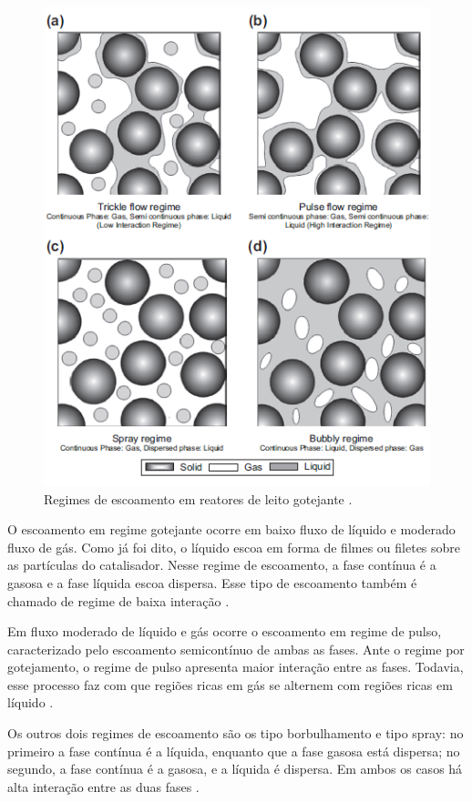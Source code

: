 \begin{enumerate}
 \begin{figure}[htb]
 \centering \includegraphics[scale=0.75]{images/Chap2/regimeescoamento.png}
 \caption{Regimes de escoamento em reatores de leito gotejante \cite{Gunjal2005}.}
 \label{fig:regimeescoamento}
 \end{figure}

O escoamento em regime gotejante ocorre em baixo fluxo de líquido e moderado
fluxo de gás. Como já foi dito, o líquido escoa em forma de filmes ou filetes
sobre as partículas do catalisador. Nesse regime de escoamento, a fase contínua
é a gasosa e a fase líquida escoa dispersa. Esse tipo de escoamento também é
chamado de regime de baixa interação \cite{Saroha1996}.

Em fluxo moderado de líquido e gás ocorre o escoamento em regime de pulso,
caracterizado pelo escoamento semicontínuo de ambas as fases. Ante o regime
por gotejamento, o regime de pulso apresenta maior interação entre as fases.
Todavia, esse processo faz com que regiões ricas em gás se alternem com regiões
ricas em líquido \cite{Saroha1996}.

Os outros dois regimes de escoamento são os tipo borbulhamento e tipo spray: no
primeiro a fase contínua é a líquida, enquanto que a fase gasosa está dispersa; no
segundo, a fase contínua é a gasosa, e a líquida é dispersa. Em ambos os casos
há alta interação entre as duas fases \cite{Saroha1996}.


\end{enumerate}
